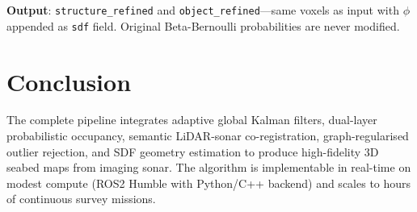 \documentclass[10pt,twocolumn]{article}
\begin{document}
\textbf{Output}: \texttt{structure\_refined} and \texttt{object\_refined}---same voxels as input with $\phi$ appended as \texttt{sdf} field. Original Beta-Bernoulli probabilities are never modified.

\section{Conclusion}

The complete pipeline integrates adaptive global Kalman filters, dual-layer probabilistic occupancy, semantic LiDAR-sonar co-registration, graph-regularised outlier rejection, and SDF geometry estimation to produce high-fidelity 3D seabed maps from imaging sonar. The algorithm is implementable in real-time on modest compute (ROS2 Humble with Python/C++ backend) and scales to hours of continuous survey missions.
\end{document}
